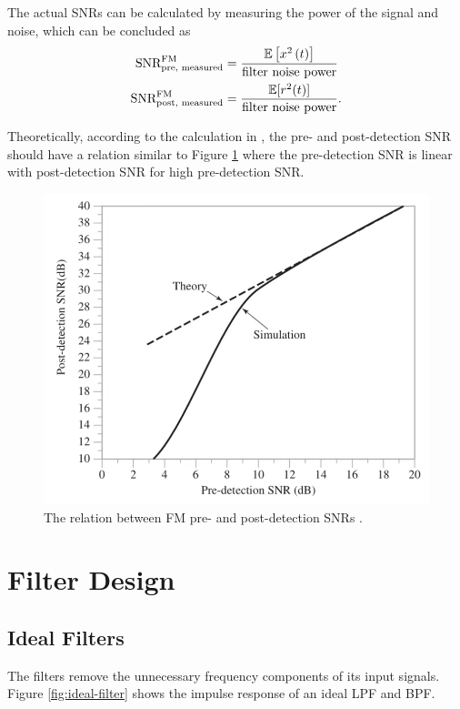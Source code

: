 \documentclass[../ECE459FinalProjectReport.tex]{subfiles}
\begin{document}
The actual SNRs can be calculated by measuring the power of the signal and noise, which can be concluded as
\begin{align}
    \text{SNR}_{\text{pre, measured}}^{\text{FM}} &= \frac{\mathbb{E}\left[x^2\left(t\right)\right]}{\text{filter noise power}}\\
    \text{SNR}_{\text{post, measured}}^{\text{FM}} &= \frac{\mathbb{E}[r^2(t)]}{\text{filter noise power}}.
\end{align}

Theoretically, according to the calculation in \cite[Sec. 9.8]{haykinIntroductionAnalogDigital2007}, the pre- and post-detection SNR should have a relation similar to Figure \ref{fig:fm-snr-theo} where the pre-detection SNR is linear with post-detection SNR for high pre-detection SNR.
\begin{figure}[tb]
    \centering
    \includegraphics[width=0.5\linewidth]{plots/fm_snr.jpg}
    \caption{The relation between FM pre- and post-detection SNRs \cite[Fig. 9.17]{haykinIntroductionAnalogDigital2007}.}
    \label{fig:fm-snr-theo}
\end{figure}


\section{Filter Design}
\subsection{Ideal Filters}
The filters remove the unnecessary frequency components of its input signals. Figure \ref{fig:ideal-filter} shows the impulse response of an ideal LPF and BPF.
\end{document}
